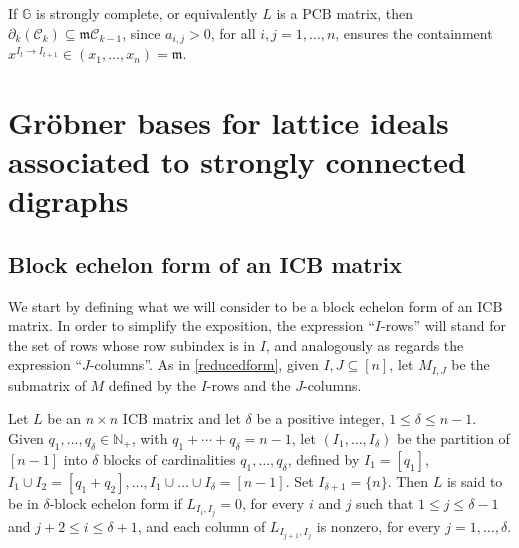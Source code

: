 \documentclass[ALCO]{cedram}
\newcommand{\mbn}{\mbox{$\mathbb{N}$}}
\newcommand{\mbg}{\mbox{$\mathbb{G}$}}
\newcommand{\mcc}{\mbox{$\mathcal{C}$}}
\newcommand{\icb}{\mbox{$\mathrm{ICB}$}}
\newcommand{\pcb}{\mbox{$\mathrm{PCB}$}}
\newcommand{\mfm}{\mbox{$\mathfrak{m}$}}
\newcommand{\dif}{\mbox{$\partial$}}
\begin{document}
\begin{remark}\label{dif-m}
If $\mbg$ is strongly complete, or equivalently $L$ is a $\pcb$
matrix, then $\dif_k(\mcc_k)\subseteq \mfm\mcc_{k-1}$, since
$a_{i,j}>0$, for all $i,j=1,\ldots ,n$, ensures the containment
$x^{I_t\to I_{t+1}}\in (x_1,\ldots ,x_n)=\mfm$.
\end{remark}

\section{Gr\"obner bases for lattice ideals associated to 
strongly connected digraphs}

\subsection{Block echelon form of an ICB matrix}\label{block-icb}

 We start by defining what we will consider to be a block
echelon form of an $\icb$ matrix. In order to simplify the exposition,
the expression ``$I$-rows'' will stand for the set of rows whose row
subindex is in $I$, and analogously as regards the expression
``$J$-columns''. As in \eqref{reducedform}, given $I,J\subseteq [n]$,
let $M_{I,J}$ be the submatrix of $M$ defined by the $I$-rows and the
$J$-columns.

\begin{definition}\label{def-echelon}
Let $L$ be an $n\times n$ $\icb$ matrix and let $\delta$ be a positive
integer, $1\leq \delta\leq n-1$. Given $q_1,\ldots ,q_\delta\in
\mbn_+$, with $q_1+\cdots+q_\delta=n-1$, let $(I_1,\ldots ,I_\delta)$
be the partition of $[n-1]$ into $\delta$ blocks of cardinalities
$q_1,\ldots ,q_\delta$, defined by $I_1=[q_1]$, $I_1\cup
I_2=[q_1+q_2],\ldots ,I_1\cup\ldots\cup I_\delta=[n-1]$.  Set
$I_{\delta+1}=\{n\}$. Then $L$ is said to be in $\delta$-block echelon
form if $L_{I_{i},I_{j}}=0$, for every $i$ and $j$ such that $1\leq
j\leq \delta-1$ and $j+2\leq i\leq \delta+1$, and each column of
$L_{I_{j+1},I_j}$ is nonzero, for every $j=1,\ldots ,\delta$.
\end{definition}
\end{document}
